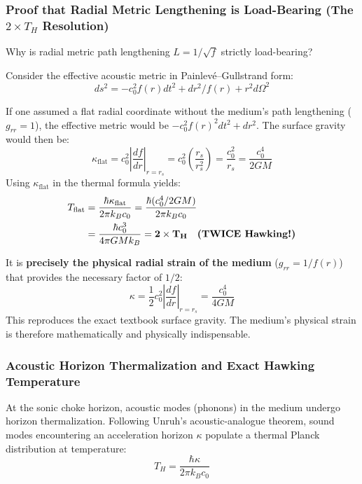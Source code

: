 \documentclass[11pt,a4paper]{article}
\begin{document}
\subsubsection{Proof that Radial Metric Lengthening is Load-Bearing (The $2 \times T_H$ Resolution)}
\label{subsubsec:hawking_factor_two}

Why is radial metric path lengthening $L = 1/\sqrt{f}$ strictly load-bearing?

Consider the effective acoustic metric in Painlevé--Gullstrand form:
\begin{equation}
ds^2 = -c_0^2 f(r) dt^2 + dr^2 / f(r) + r^2 d\Omega^2
\end{equation}

If one assumed a flat radial coordinate without the medium's path lengthening ($g_{rr} = 1$), the effective metric would be $-c_0^2 f(r)^2 dt^2 + dr^2$. The surface gravity would then be:
\begin{equation}
\kappa_{\text{flat}} = c_0^2 \left| \frac{df}{dr} \right|_{r=r_s} = c_0^2 \left( \frac{r_s}{r_s^2} \right) = \frac{c_0^2}{r_s} = \frac{c_0^4}{2GM}
\end{equation}
Using $\kappa_{\text{flat}}$ in the thermal formula yields:
\begin{equation}
\begin{aligned} T_{\text{flat}} &= \frac{\hbar \kappa_{\text{flat}}}{2\pi k_B c_0} = \frac{\hbar (c_0^4 / 2GM)}{2\pi k_B c_0} \\ &= \frac{\hbar c_0^3}{4\pi G M k_B} = \mathbf{2 \times T_H} \quad \text{\textbf{(TWICE Hawking!)}} \end{aligned}
\end{equation}

It is \textbf{precisely the physical radial strain of the medium} ($g_{rr} = 1/f(r)$) that provides the necessary factor of $1/2$:
\begin{equation}
\kappa = \frac{1}{2} c_0^2 \left| \frac{df}{dr} \right|_{r=r_s} = \frac{c_0^4}{4GM}
\end{equation}
This reproduces the exact textbook surface gravity. The medium's physical strain is therefore mathematically and physically indispensable.

\subsubsection{Acoustic Horizon Thermalization and Exact Hawking Temperature}
\label{subsubsec:th_exact}

At the sonic choke horizon, acoustic modes (phonons) in the medium undergo horizon thermalization. Following Unruh's acoustic-analogue theorem, sound modes encountering an acceleration horizon $\kappa$ populate a thermal Planck distribution at temperature:
\begin{equation}
T_H = \frac{\hbar \kappa}{2\pi k_B c_0}
\label{eq:unruh_th}
\end{equation}
\end{document}
